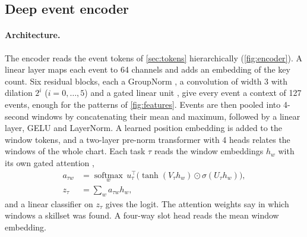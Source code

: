 \documentclass[10pt,twocolumn]{article}
\begin{document}
\subsection{Deep event encoder}\label{sec:deep}
\paragraph{Architecture.} The encoder reads the event tokens of \cref{sec:tokens} hierarchically (\cref{fig:encoder}). A linear layer maps each event to 64 channels and adds an embedding of the key count. Six residual blocks, each a GroupNorm \citep{wu2018groupnorm}, a convolution of width 3 with dilation $2^{i}$ ($i=0,\dots,5$) and a gated linear unit \citep{dauphin2017glu}, give every event a context of 127 events, enough for the patterns of \cref{fig:features}. Events are then pooled into 4-second windows by concatenating their mean and maximum, followed by a linear layer, GELU and LayerNorm. A learned position embedding is added to the window tokens, and a two-layer pre-norm transformer \citep{vaswani2017attention} with 4 heads relates the windows of the whole chart. Each task $\tau$ reads the window embeddings $h_w$ with its own gated attention \citep{ilse2018attention},
\begin{align}
a_{\tau w}&=\operatorname*{softmax}_w\, u_\tau^{\!\top}\!\big(\tanh(V_\tau h_w)\odot\sigma(U_\tau h_w)\big),\\
z_\tau&=\textstyle\sum_w a_{\tau w}h_w,
\end{align}
and a linear classifier on $z_\tau$ gives the logit. The attention weights say in which windows a skillset was found. A four-way slot head reads the mean window embedding.
\end{document}
